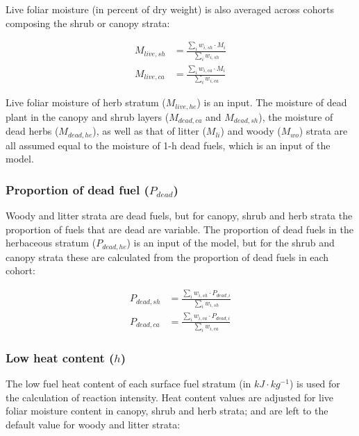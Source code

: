 \documentclass[]{book}
\begin{document}
Live foliar moisture (in percent of dry weight) is also averaged across
cohorts composing the shrub or canopy strata:

\begin{eqnarray}
M_{live, sh} &= \frac{\sum_{i}{w_{i,sh} \cdot M_i}}{\sum_{i}{w_{i,sh}}} \\
M_{live, ca} &= \frac{\sum_{i}{w_{i,ca} \cdot M_i}}{\sum_{i}{w_{i,ca}}}
\end{eqnarray}

Live foliar moisture of herb stratum (\(M_{live, he}\)) is an input. The
moisture of dead plant in the canopy and shrub layers (\(M_{dead, ca}\)
and \(M_{dead, sh}\)), the moisture of dead herbs (\(M_{dead, he}\)), as
well as that of litter (\(M_{li}\)) and woody (\(M_{wo}\)) strata are
all assumed equal to the moisture of 1-h dead fuels, which is an input
of the model.

\subsubsection{\texorpdfstring{Proportion of dead fuel
(\(P_{dead}\))}{Proportion of dead fuel (P\_\{dead\})}}\label{proportion-of-dead-fuel-p_dead}

Woody and litter strata are dead fuels, but for canopy, shrub and herb
strata the proportion of fuels that are dead are variable. The
proportion of dead fuels in the herbaceous stratum (\(P_{dead,he}\)) is
an input of the model, but for the shrub and canopy strata these are
calculated from the proportion of dead fuels in each cohort:

\begin{eqnarray}
P_{dead,sh} &= \frac{\sum_{i}{w_{i,sh} \cdot P_{dead,i}}}{\sum_{i}{w_{i,sh}}} \\
P_{dead, ca} &= \frac{\sum_{i}{w_{i,ca} \cdot P_{dead,i}}}{\sum_{i}{w_{i,ca}}}
\end{eqnarray}

\subsubsection{\texorpdfstring{Low heat content
(\(h\))}{Low heat content (h)}}\label{low-heat-content-h}

The low fuel heat content of each surface fuel stratum (in
\(kJ\cdot kg^{-1}\)) is used for the calculation of reaction intensity.
Heat content values are adjusted for live foliar moisture content in
canopy, shrub and herb strata; and are left to the default value for
woody and litter strata:
\end{document}
